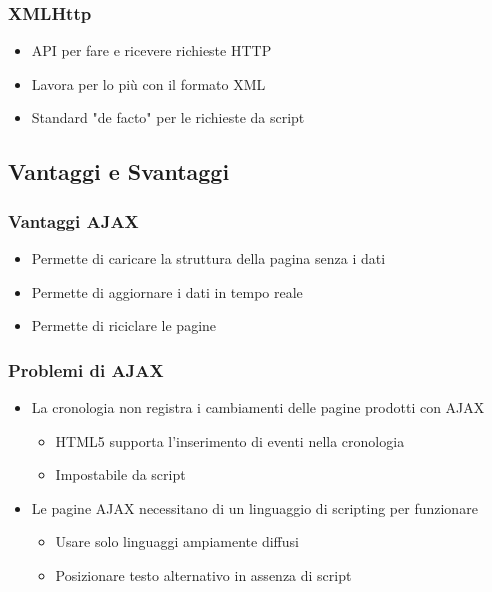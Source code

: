 \documentclass{beamer}
\begin{document}
\begin{frame}
    \frametitle{XMLHttp}
    \begin{itemize}
    \item <1-> API per fare e ricevere richieste HTTP
    \item <2-> Lavora per lo più con il formato XML
    \item <3-> Standard "de facto" per le richieste da script
    \end{itemize}

\end{frame}


\subsection{Vantaggi e Svantaggi}
\begin{frame}
    \frametitle{Vantaggi AJAX}
    \begin{itemize}
    \item<1-> Permette di caricare la struttura della pagina senza i dati    
    \item<2-> Permette di aggiornare i dati in tempo reale
    \item<3-> Permette di riciclare le pagine
    \end{itemize}
\end{frame}

\begin{frame}
    \frametitle{Problemi di AJAX}
    \begin{itemize}
    \item<1-> La cronologia non registra i cambiamenti delle pagine prodotti con AJAX
    \begin{itemize}
        \item <3-> HTML5 supporta l'inserimento di eventi nella cronologia
        \item <3-> Impostabile da script
    \end{itemize}
    \item<2-> Le pagine AJAX necessitano di un linguaggio di scripting per funzionare
    \begin{itemize}
        \item <4-> Usare solo linguaggi ampiamente diffusi
        \item <4-> Posizionare testo alternativo in assenza di script
    \end{itemize}
    \end{itemize}
\end{frame}
\end{document}
